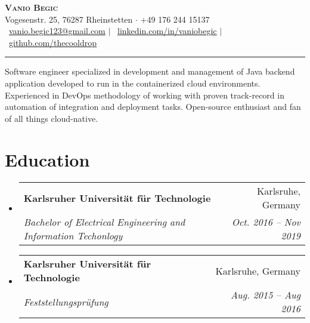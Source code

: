 \documentclass[letterpaper,11pt]{article}
\makeatletter
\newcommand{\resumeSubheading}[4]{
	\vspace{-2pt}\item
	\begin{tabular*}{0.97\textwidth}[t]{l@{\extracolsep{\fill}}r}
		\textbf{#1} & #2 \\
		\textit{\small#3} & \textit{\small #4} \\
	\end{tabular*}\vspace{-7pt}
}
\newcommand{\resumeSubHeadingListStart}{\begin{itemize}[leftmargin=0.15in, label={}]}
\newcommand{\resumeSubHeadingListEnd}{\end{itemize}}
\makeatother
\begin{document}
	
	
	\begin{center}
		\textbf{\Huge \scshape Vanio Begic} \\ \vspace{2pt} 
		Vogesenstr. 25, 76287 Rheinstetten $\cdot$ \small +49 176 244 15137 \\ \vspace{2pt}
		\faEnvelope \ \href{mailto:vanio.begic123@gmail.com.com}{\underline{vanio.begic123@gmail.com}} $|$ 
		\faLinkedin \ \href{https://linkedin.com/in/vaniobegic}{\underline{linkedin.com/in/vaniobegic}} $|$
		\faGithub \ \href{https://github.com/thecooldrop}{\underline{github.com/thecooldrop}}
	\end{center}
	
	\rule[5pt]{\textwidth}{2pt}
	
	Software engineer specialized in development and management of Java backend application developed to
	run in the containerized cloud environments. Experienced in DevOps methodology of working with proven
	track-record in automation of integration and deployment tasks. Open-source enthusiast and fan of all
	things cloud-native.
	
	\section{Education}
	\resumeSubHeadingListStart
	\resumeSubheading
	{Karlsruher Universität für Technologie}{Karlsruhe, Germany}
	{Bachelor of Electrical Engineering and Information Techonlogy}{Oct. 2016 -- Nov 2019}
	\resumeSubheading
	{Karlsruher Universität für Technologie}{Karlsruhe, Germany}
	{Feststellungsprüfung}{Aug. 2015 -- Aug 2016}
	\resumeSubHeadingListEnd
	
	
\end{document}

